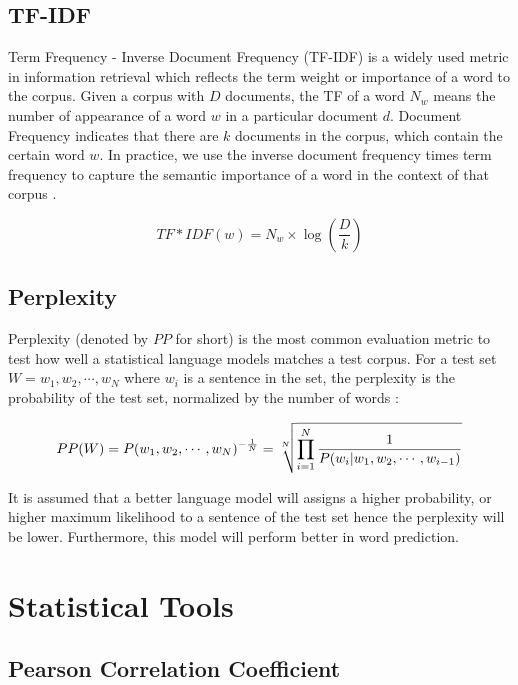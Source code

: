 \subsection{TF-IDF}
Term Frequency - Inverse Document Frequency (TF-IDF) is a widely used metric in information retrieval which reflects the term weight or importance of a word to the corpus. Given a corpus with $D$ documents, the TF of a word $N_w$ means the number of appearance of a word $w$ in a particular document $d$. Document Frequency indicates that there are $k$ documents in the corpus, which contain the certain word $w$. In practice, we use the inverse document frequency times term frequency to capture the semantic importance of a word in the context of that corpus \citep{Jurafsky2008}.

\begin{equation}
TF*IDF(w) = N_w \times \log(\frac{D}{k})
\label{eq:tf-idf}
\end{equation}

\subsection{Perplexity}
Perplexity (denoted by $PP$ for short) is the most common evaluation metric to test how well a statistical language models matches a test corpus.  For a test set $W = {w_1, w_2, \cdots, w_N}$ where $w_i$ is a sentence in the set, the perplexity is the probability of the test set, normalized by the number of words \citep{Jurafsky2008}:

\begin{equation}
PP(W) = P(w_1, w_2, \cdots, w_N)^{-\frac{1}{N}}\\
= \sqrt[N]{\prod_{i=1}^{N} \frac{1}{P(w_i|w_1, w_2,\cdots, w_{i-1})}}
\label{eq:perplexity}
\end{equation}

It is assumed that a better language model will assigns a higher probability, or higher maximum likelihood to a sentence of the test set hence the perplexity will be lower. Furthermore, this model will perform better in word prediction.

\section{Statistical Tools}

\subsection{Pearson Correlation Coefficient}

